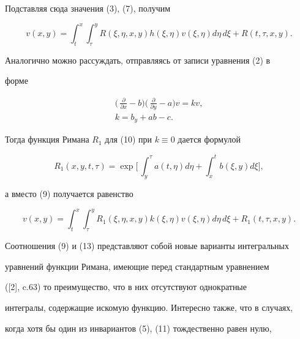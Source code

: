Подставляя сюда значения (3), (7), получим


\begin{equation}


v(x,y)=\int^x_t\int^y_\tau R(\xi,\eta,x,y)h(\xi,\eta)


v(\xi,\eta)d\eta\,d\xi+R(t,\tau,x,y).


\end{equation}





Аналогично можно рассуждать, отправляясь от записи уравнения (2) в


форме


\begin{gather}


\biggl(\,\frac{\partial}{\partial x}-b\biggr)


\biggl(\,\frac{\partial}{\partial y}-a\biggr)v=kv,\\


k=b_y+ab-c.


\end{gather}


Тогда функция Римана $R_1$ для (10) при $k\equiv 0$ дается формулой


\begin{equation}


R_1(x,y,t,\tau)=\exp\biggl[\,\int^\tau_y a(t,\eta)d\eta+


\int^t_x b(\xi,y)d\xi\biggr],


\end{equation}


а вместо (9) получается равенство


\begin{equation}


v(x,y)=\int^x_t\int^y_\tau R_1(\xi,\eta,x,y)k(\xi,\eta)


v(\xi,\eta)d\eta\,d\xi +R_1(t,\tau,x,y).


\end{equation}


Соотношения (9) и (13) представляют собой новые варианты интегральных


уравнений функции Римана, имеющие перед стандартным уравнением


([2], c.63) то преимущество, что в них отсутствуют однократные


интегралы, содержащие искомую функцию. Интересно также, что в случаях,


когда хотя бы один из инвариантов (5), (11) тождественно равен нулю,


